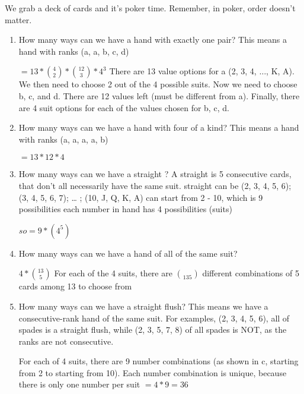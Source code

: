 \question 
We grab a deck of cards and it’s poker time. Remember, in poker, order doesn’t matter. 
\begin{enumerate}[label=(\alph*)]
\item
How many ways can we have a hand with exactly one pair? This means a hand with ranks (a, a, b, c, d)
\begin{solution}
$= 13 * {4 \choose 2} * {12 \choose 3} * 4^3$ 
There are 13 value options for a (2, 3, 4, $\dots$, K, A). We then need to choose 2 out of the 4 possible suits. Now we need to choose b, c, and d. There are 12 values left (must be different from a). Finally, there are 4 suit options for each of the values chosen for b, c, d.
\end{solution}
\item How many ways can we have a hand with four of a kind? This means a hand with ranks (a, a, a, a, b)
\begin{solution} $= 13 * 12 * 4$ \end{solution}

\item How many ways can we have a straight ? A straight is 5 consecutive cards, that don’t all necessarily have the same suit. 
straight can be (2, 3, 4, 5, 6); (3, 4, 5, 6, 7); … ; (10, J, Q, K, A)
can start from 2 - 10, which is 9 possibilities
each number in hand has 4 possibilities (suits)
\begin{solution} $so = 9 * (4^5)$ \end{solution}
\item How many ways can we have a hand of all of the same suit? 
\begin{solution} $4 * {13 \choose 5}$ 
For each of the 4 suits, there are $\choose{13}{5}$ different combinations of 5 cards among 13 to choose from 
\end{solution}
\item How many ways can we have a straight flush? This means we have a consecutive-rank hand of the same suit. For examples, (2, 3, 4, 5, 6), all of spades is a straight flush, while (2, 3, 5, 7, 8) of all spades is NOT, as the ranks are not consecutive. 
\begin{solution}
For each of 4 suits, there are 9 number combinations (as shown in c, starting from 2 to starting from 10). Each number combination is unique, because there is only one number per suit
$= 4 * 9 = 36$
\end{solution}

\end{enumerate}